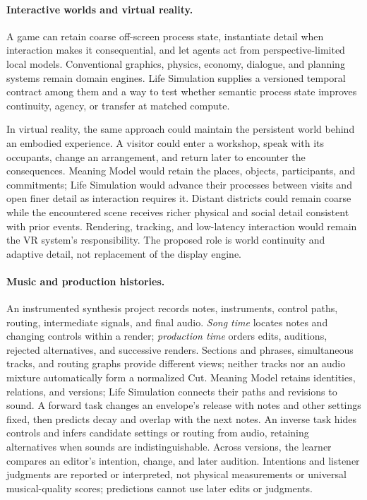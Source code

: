 \documentclass[10pt]{article}
\begin{document}
\paragraph{Interactive worlds and virtual reality.}
A game can retain coarse off-screen process state, instantiate detail when
interaction makes it consequential, and let agents act from perspective-limited
local models. Conventional graphics, physics, economy, dialogue, and planning
systems remain domain engines. Life Simulation supplies a versioned temporal
contract among them and a way to test whether semantic process state improves
continuity, agency, or transfer at matched compute.

In virtual reality, the same approach could maintain the persistent world
behind an embodied experience. A visitor could enter a workshop, speak with
its occupants, change an arrangement, and return later to encounter the
consequences. Meaning Model would retain the places, objects, participants,
and commitments; Life Simulation would advance their processes between visits
and open finer detail as interaction requires it. Distant districts could
remain coarse while the encountered scene receives richer physical and social
detail consistent with prior events. Rendering, tracking, and low-latency
interaction would remain the VR system's responsibility. The proposed role is
world continuity and adaptive detail, not replacement of the display engine.

\paragraph{Music and production histories.}
An instrumented synthesis project records notes, instruments, control paths,
routing, intermediate signals, and final audio. \emph{Song time} locates notes
and changing controls within a render; \emph{production time} orders edits,
auditions, rejected alternatives, and successive renders. Sections and phrases,
simultaneous tracks, and routing graphs provide different views; neither
tracks nor an audio mixture automatically form a normalized Cut. Meaning
Model retains identities, relations, and versions; Life Simulation connects
their paths and revisions to sound. A forward task changes an envelope's
release with notes and other settings fixed, then predicts decay and overlap
with the next notes.
An inverse task hides controls and infers candidate settings or routing from
audio, retaining alternatives when sounds are indistinguishable. Across
versions, the learner compares an editor's intention, change, and later
audition. Intentions and listener judgments are reported or interpreted, not
physical measurements or universal musical-quality scores; predictions cannot
use later edits or judgments.
\end{document}
